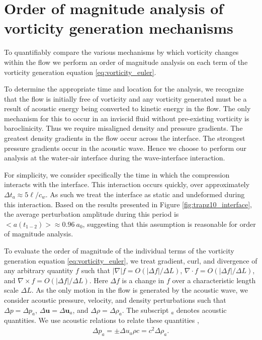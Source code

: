 \documentclass{jfm}%
\newcommand{\orderof}[1]{\ensuremath{\textit{O}\left(#1\right)}}
\newcommand{\abs}[1]{\ensuremath{\left|#1\right|}}
\begin{document}
\appendix
\section{Order of magnitude analysis of vorticity generation mechanisms}
\label{sec:oom_analysis}
To quantifiably compare the various mechanisms by which vorticity
changes within the flow we perform an order of magnitude analysis on
each term of the vorticity generation equation
\eqref{eq:vorticity_euler}.

To determine the appropriate time and location for the analysis, we
recognize that the flow is initially free of vorticity and any
vorticity generated must be a result of acoustic energy being
converted to kinetic energy in the flow. The only mechanism for
this to occur in an inviscid fluid without pre-existing vorticity is
baroclinicity. Thus we require misaligned density and pressure
gradients. The greatest density gradients in the flow occur across the
interface. The strongest pressure gradients occur in the acoustic
wave. Hence we choose to perform our analysis at the water-air
interface during the wave-interface interaction.

For simplicity, we consider specifically the time in which the
compression interacts with the interface. This interaction occurs
quickly, over approximately $\Delta t_a\approx5\ell/c_{w}$. As such we
treat the interface as static and undeformed during this
interaction. Based on the results presented in Figure
\ref{fig:trapz10_interface}, the average perturbation amplitude during
this period is $<a(t_{1-2})>\approx0.96\ a_0$, suggesting that this
assumption is reasonable for order of magnitude analysis.

To evaluate the order of magnitude of the individual terms of the
vorticity generation equation \eqref{eq:vorticity_euler}, we treat
gradient, curl, and divergence of any arbitrary quantity $f$ such that
$\abs{\nabla} f= \orderof{\left|\Delta f\right|/\Delta L}$,
$\nabla\cdot f=\orderof{\left|\Delta f\right|/\Delta L}$, and
$\nabla\times f=\orderof{\left|\Delta f\right|/\Delta L}$. Here
$\Delta f$ is a change in $f$ over a characteristic length scale
$\Delta L$. As the only motion in the flow is generated by the
acoustic wave, we consider acoustic pressure, velocity, and density
perturbations such that $\Delta p=\Delta p_a$,
$\Delta \boldsymbol{u}=\Delta \boldsymbol{u}_a$, and
$\Delta \rho=\Delta \rho_a$. The subscript $_a$ denotes acoustic
quantities. We use acoustic relations to relate these quantities
\citep{Anderson1990},
\begin{align}%
  \label{eq:acoustic_relations}%
  \Delta p_a=\pm\Delta u_a \rho c=c^2\Delta \rho_a.%
\end{align}
\end{document}
